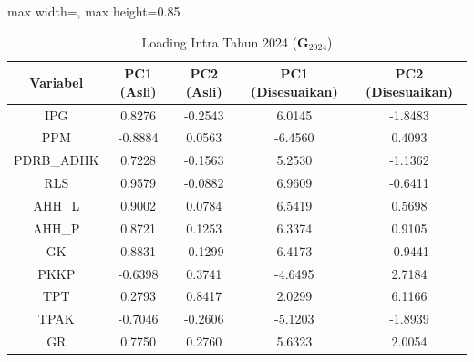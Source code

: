 \begin{table}[H]
\centering
\caption{Loading Intra Tahun 2024 ($\mathbf{G}_{2024}$)} \label{tab:app1loading_intra_2024}
\begin{adjustbox}{max width=\textwidth, max height=0.85\textheight}
\begin{tabular}{|c|c|c|c|c|}
\hline
\textbf{Variabel} & \textbf{PC1 (Asli)} & \textbf{PC2 (Asli)} & \textbf{PC1 (Disesuaikan)} & \textbf{PC2 (Disesuaikan)} \\
\hline
IPG & 0.8276 & -0.2543 & 6.0145 & -1.8483 \\
PPM & -0.8884 & 0.0563 & -6.4560 & 0.4093 \\
PDRB\_ADHK & 0.7228 & -0.1563 & 5.2530 & -1.1362 \\
RLS & 0.9579 & -0.0882 & 6.9609 & -0.6411 \\
AHH\_L & 0.9002 & 0.0784 & 6.5419 & 0.5698 \\
AHH\_P & 0.8721 & 0.1253 & 6.3374 & 0.9105 \\
GK & 0.8831 & -0.1299 & 6.4173 & -0.9441 \\
PKKP & -0.6398 & 0.3741 & -4.6495 & 2.7184 \\
TPT & 0.2793 & 0.8417 & 2.0299 & 6.1166 \\
TPAK & -0.7046 & -0.2606 & -5.1203 & -1.8939 \\
GR & 0.7750 & 0.2760 & 5.6323 & 2.0054 \\
\hline
\end{tabular}
\end{adjustbox}
\end{table}